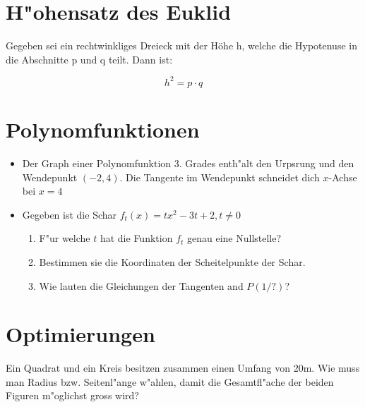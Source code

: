 \documentclass{article}
\begin{document}
\section{H"ohensatz des Euklid}

Gegeben sei ein rechtwinkliges Dreieck mit der Höhe h, welche die Hypotenuse in die Abschnitte p und q teilt. Dann ist:

\begin{equation}
h^2 = p\cdot q
\end{equation}

\section{Polynomfunktionen}
\begin{itemize}
\item Der Graph einer Polynomfunktion 3. Grades enth"alt den Urpsrung und den Wendepunkt \( (-2,4) \). Die Tangente im Wendepunkt schneidet dich \(x\)-Achse  bei \( x = 4\)
\item Gegeben ist die Schar \( f_t(x) = tx^2 - 3t + 2, t\neq 0 \) \begin{enumerate}
\item F"ur welche $t$ hat die Funktion $f_t$ genau eine Nullstelle?
\item Bestimmen sie die Koordinaten der Scheitelpunkte der Schar.
\item Wie lauten die Gleichungen der Tangenten and $P(1/?)$?
\end{enumerate}
\end{itemize}


\section{Optimierungen}

Ein Quadrat und ein Kreis besitzen zusammen einen Umfang von 20m. Wie muss man Radius bzw. Seitenl"ange w"ahlen, damit die Gesamtfl"ache der beiden Figuren m"oglichst gross wird?
\end{document}
